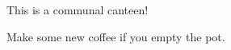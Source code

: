 \documentclass{article}
\begin{document}
\hovedoverskrift{}

\maketitle

\begin{center}
  \fontsize{72}{18}\selectfont
  This is a communal canteen!

\vspace{2cm}

  \fontsize{48}{18}\selectfont
  Make some new coffee if you empty the pot.
\end{center}

\underskriv
\end{document}
